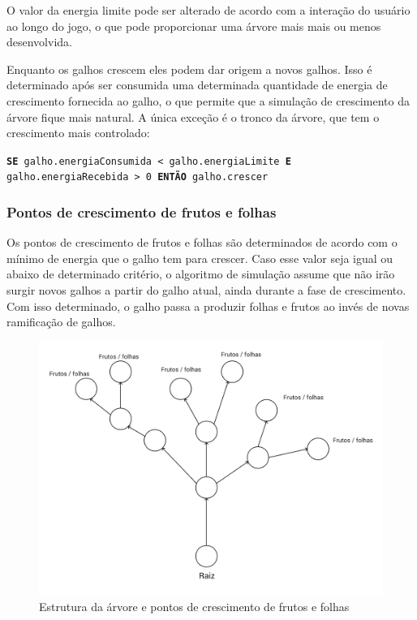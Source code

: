 \documentclass[12pt]{article}
\begin{document}
O valor da energia limite pode
ser alterado de acordo com a intera\c c\~ao do usu\'ario ao longo do jogo, o que pode proporcionar uma \'arvore mais
mais ou menos desenvolvida.

Enquanto os galhos crescem eles podem dar origem a novos galhos. Isso \'e determinado ap\'os ser consumida uma determinada
quantidade de energia de crescimento fornecida ao galho, o que permite que a simula\c c\~ao de crescimento da \'arvore
fique mais natural. A \'unica exce\c c\~ao \'e o tronco da \'arvore, que tem o crescimento
mais controlado:

\texttt{\footnotesize{\textbf{SE} galho.energiaConsumida < galho.energiaLimite \textbf{E} galho.energiaRecebida > 0
\textbf{ENT\~AO} galho.crescer}}

\subsubsection{Pontos de crescimento de frutos e folhas}
Os pontos de crescimento de frutos e folhas s\~ao determinados de acordo com o m\'inimo de energia que o galho
tem para crescer. Caso esse valor seja igual ou abaixo de determinado crit\'erio, o algoritmo de simula\c c\~ao assume
que n\~ao ir\~ao surgir novos galhos a partir do galho atual, ainda durante a fase de crescimento. Com isso determinado,
o galho passa a produzir folhas e frutos ao inv\'es de novas ramifica\c c\~ao de galhos.

	\begin{figure}[ht!]
	\begin{center}
		\includegraphics[scale=0.15]{img/PI3_Arvore.png}
		\footnotesize \caption{Estrutura da \'arvore e pontos de crescimento de frutos e folhas }
	\end{center}
	\end{figure}	
\newpage
\end{document}
